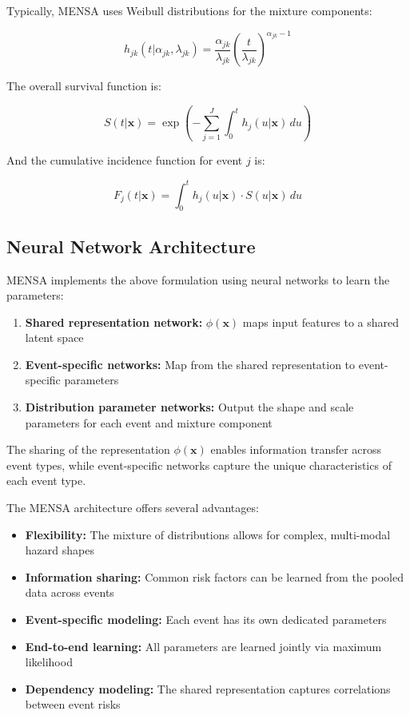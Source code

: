 Typically, MENSA uses Weibull distributions for the mixture components:

\begin{equation}
h_{jk}(t|\alpha_{jk}, \lambda_{jk}) = \frac{\alpha_{jk}}{\lambda_{jk}} \left(\frac{t}{\lambda_{jk}}\right)^{\alpha_{jk}-1}
\end{equation}

The overall survival function is:

\begin{equation}
S(t|\mathbf{x}) = \exp\left(-\sum_{j=1}^{J} \int_0^t h_j(u|\mathbf{x}) \, du\right)
\end{equation}

And the cumulative incidence function for event $j$ is:

\begin{equation}
F_j(t|\mathbf{x}) = \int_0^t h_j(u|\mathbf{x}) \cdot S(u|\mathbf{x}) \, du
\end{equation}

\subsection{Neural Network Architecture}

MENSA implements the above formulation using neural networks to learn the parameters:

\begin{enumerate}
    \item \textbf{Shared representation network:} $\phi(\mathbf{x})$ maps input features to a shared latent space
    \item \textbf{Event-specific networks:} Map from the shared representation to event-specific parameters
    \item \textbf{Distribution parameter networks:} Output the shape and scale parameters for each event and mixture component
\end{enumerate}

The sharing of the representation $\phi(\mathbf{x})$ enables information transfer across event types, while event-specific networks capture the unique characteristics of each event type.

\begin{notebox}[title=Advantages of the MENSA Architecture]
The MENSA architecture offers several advantages:
\begin{itemize}
    \item \textbf{Flexibility:} The mixture of distributions allows for complex, multi-modal hazard shapes
    \item \textbf{Information sharing:} Common risk factors can be learned from the pooled data across events
    \item \textbf{Event-specific modeling:} Each event has its own dedicated parameters
    \item \textbf{End-to-end learning:} All parameters are learned jointly via maximum likelihood
    \item \textbf{Dependency modeling:} The shared representation captures correlations between event risks
\end{itemize}
\end{notebox}


